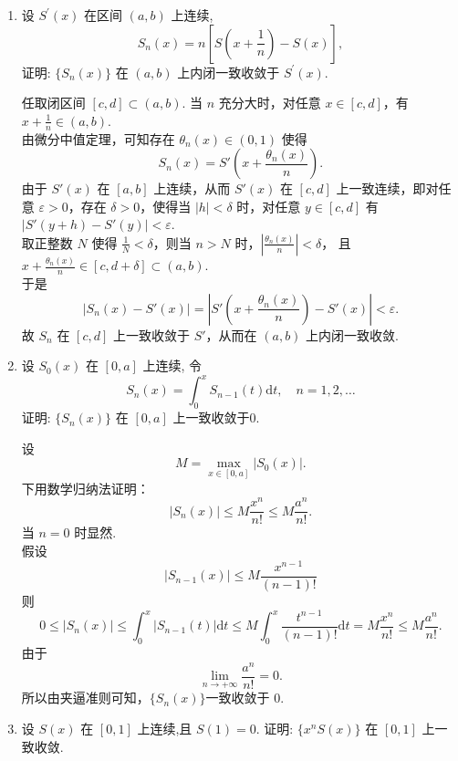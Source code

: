 \begin{enumerate}
    \item[6.]设 \(\displaystyle S^{\prime}(x)\) 在区间 \((a,b)\) 上连续,
    \[\displaystyle S_{n}(x) = n\left[S\left(x + \frac{1}{n}\right) - S(x)\right],\]
    证明: \(\displaystyle \{S_{n}(x)\}\) 在 \((a,b)\) 上内闭一致收敛于 \(\displaystyle S^{\prime}(x)\).
    \begin{solution}
        任取闭区间 $[c,d] \subset (a,b)$. 当 $n$ 充分大时，对任意 $x\in[c,d]$，有 $\displaystyle x+\frac{1}{n}\in(a,b)$.\\
        由微分中值定理，可知存在 $\displaystyle \theta_n(x)\in(0,1)$ 使得
        \[
        S_n(x) = S'\left(x+\frac{\theta_n(x)}{n}\right).
        \]
        由于 $S'(x)$ 在 $[a,b]$ 上连续，从而 $S'(x)$ 在 $[c,d]$ 上一致连续，即对任意 $\varepsilon>0$，存在 $\delta>0$，使得当 $|h|<\delta$ 时，对任意 $y\in[c,d]$ 有 $|S'(y+h)-S'(y)|<\varepsilon$.\\
        取正整数 $N$ 使得 $\displaystyle \frac{1}{N}<\delta$，则当 $n>N$ 时，$\displaystyle  \left|\frac{\theta_n(x)}{n}\right|<\delta$，
        且 $\displaystyle x+\frac{\theta_n(x)}{n}\in[c,d+\delta]\subset(a,b)$.\\
        于是
        \[
        |S_n(x)-S'(x)| = \left|S'\left(x+\frac{\theta_n(x)}{n}\right)-S'(x)\right| < \varepsilon.
        \]
        故 $S_n$ 在 $[c,d]$ 上一致收敛于 $S'$，从而在 $(a,b)$ 上内闭一致收敛.
    \end{solution}

    \item[7.]设 \(S_{0}(x)\) 在 \([0,a]\) 上连续, 令
    \[\displaystyle S_{n}(x) = \int_{0}^{x}S_{n - 1}(t)\mathrm{d}t,\quad n = 1,2,\dots\]
    证明: \(\displaystyle \{S_{n}(x)\}\) 在 \([0,a]\) 上一致收敛于0.
    \begin{solution}
        设 
        \[
        M = \max_{x\in[0,a]} |S_0(x)|.
        \]
        下用数学归纳法证明：
        \[
        |S_n(x)| \le M \frac{x^n}{n!} \le M \frac{a^n}{n!}.
        \]
        当 $n=0$ 时显然.\\
        假设 
        \[
        |S_{n-1}(x)| \le M \frac{x^{n-1}}{(n-1)!}
        \]
        则
        \[
        0\leq |S_n(x)| \le \int_0^x |S_{n-1}(t)| \mathrm{d}t \le M \int_0^x \frac{t^{n-1}}{(n-1)!} \mathrm{d}t = M \frac{x^n}{n!} \le M \frac{a^n}{n!}.
        \]
        由于 
        \[
        \lim_{n\to+\infty} \frac{a^n}{n!}=0.
        \]
        所以由夹逼准则可知，$\{S_n(x)\}$一致收敛于 0.
    \end{solution}

    \item[8.]设 \(S(x)\) 在 \([0,1]\) 上连续,且 \(S(1) = 0\).
    证明: \(\displaystyle\{x^{n}S(x)\}\) 在 \([0,1]\) 上一致收敛.


\end{enumerate}
